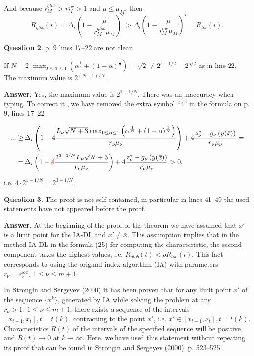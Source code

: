 \documentclass[12pt]{article}%
\begin{document}
And because $r_{M}^{glob} > r_{M}^{loc} > 1$ and $\mu \leq \mu_M$, then
\[ 
	R_{glob}(i) = \Delta_i\left(1-\frac{\mu}{r_M^{glob}\mu_M} \right)^2 > \Delta_i\left(1-\frac{\mu}{r_M^{loc}\mu_M} \right)^2 = R_{loc}(i).
\]

\phantom{f}

\textbf{Question 2}. p. 9 lines 17--22 are not clear.

If $N = 2$ $\max_{0\leq\alpha\leq 1} {\left( \alpha^{\frac{1}{2}}+(1-\alpha)^{\frac{1}{2}} \right)} = \sqrt{2} \neq 2^{3-1/2}=2^{5/2}$ as in line 22. The maximum value is $2^{(N-1)/N}$.


\textbf{Answer}. Yes, the maximum value is $2^{1-1/N}$.
There was an inaccuracy when typing. To correct it , we have removed the extra symbol ``4'' in the formula on p. 9, lines 17--22

\begin{align*}
	...& \geq \Delta_i\left(1-4\frac{L_{\nu}\sqrt{N+3}\max_{0\leq\alpha\leq1} {\left( \alpha^{\frac{1}{N}}+(1-\alpha)^{\frac{1}{N}} \right)}}{r_{\nu}\mu_{\nu}} \right) + 4\frac{z_{\nu}^{\ast}-g_{\nu}\left( y(\bar x) \right)}{r_{\nu}\mu_{\nu}} = \\
	& = \Delta_i\left(1- { \color{red} \cancel 4} \frac{2^{3-1/N}L_{\nu}\sqrt{N+3}}{r_{\nu}\mu_{\nu}} \right)+4\frac{z_{\nu}^{\ast}-g_{\nu}\left( y(\bar x) \right)}{r_{\nu}\mu_{\nu}} > 0,
\end{align*}
 
i.e. $4 \cdot 2^{1-1/N} = 2^{3-1/N}$.


\phantom{f}

\textbf{Question 3}. The proof is not self contained, in particular in lines 41--49 the used statements have not appeared before the proof.


\textbf{Answer}. At the beginning of the proof of the theorem we have assumed that $x'$ is a limit point for the IA-DL and  $x' \neq \bar x$. 
This assumption implies that in the method IA-DL in the formula (25) for computing the characteristic, the second component takes the highest values, i.e. $R_{glob}(t) < \rho R_{loc}(t)$. This fact corresponds to using the original index algorithm (IA) with parameters $r_\nu = r_\nu^{loc}, \; 1 \leq \nu \leq m+1$.

In Strongin and Sergeyev (2000) it has been proven that for any limit point $x'$ of the sequence $\{x^k\}$, generated by IA while solving the problem at any $r_\nu > 1, \; 1 \leq \nu \leq m+1$, there exists a sequence
of the intervals $[x_{t-1}, x_t], t=t(k)$, contracting to the point $x'$, i.e. $x' \in [x_{t-1}, x_t], t=t(k)$. Characteristics $R(t)$ of the intervals of the specified sequence will be positive and $R(t) \rightarrow 0$ at $k \rightarrow \infty$. 
Here, we have used this statement without repeating its proof that can be found in Strongin and Sergeyev (2000), p. 523--525.
\end{document}
